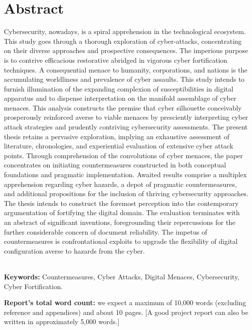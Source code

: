 \chapter*{\center \Large  Abstract}


Cybersecurity, nowadays, is a spiral apprehension in the technological ecosystem. This study goes through a thorough exploration of cyber-attacks, concentrating on their diverse approaches and prospective consequences. The imperious purpose is to contrive efficacious restorative abridged in vigorous cyber fortification techniques. A consequential menace to humanity, corporations, and nations is the accumulating worldliness and prevalence of cyber assaults. This study intends to furnish illumination of the expanding complexion of susceptibilities in digital apparatus and to dispense interpretation on the manifold assemblage of cyber menaces. This analysis constructs the premise that cyber silhouette conceivably prosperously reinforced averse to viable menaces by presciently interpreting cyber attack strategies and prudently contriving cybersecurity assessments. The present thesis retains a pervasive exploration, implying an exhaustive assessment of literature, chronologies, and experiential evaluation of extensive cyber attack points. Through comprehension of the convolutions of cyber menaces, the paper concentrates on initiating countermeasures constructed in both conceptual foundations and pragmatic implementation. Awaited results comprise a multiplex apprehension regarding cyber hazards, a depot of pragmatic countermeasures, and additional propositions for the inclusion of thriving cybersecurity approaches. The thesis intends to construct the foremost perception into the contemporary argumentation of fortifying the digital domain. The evaluation terminates with an abstract of significant inventions, foregrounding their repercussions for the further considerable concern of document reliability. The impetus of countermeasures is confrontational exploits to upgrade the flexibility of digital configuration averse to hazards from the cyber.


~\\[1cm]
\noindent %
\textbf{Keywords:} Countermeasures, Cyber Attacks, Digital Menaces, Cybersecurity, Cyber Fortification.

\vfill
\noindent
\textbf{Report's total word count:} we expect a maximum of 10,000 words (excluding reference and appendices) and about 10 pages. [A good project report can also be written in approximately 5,000 words.]

